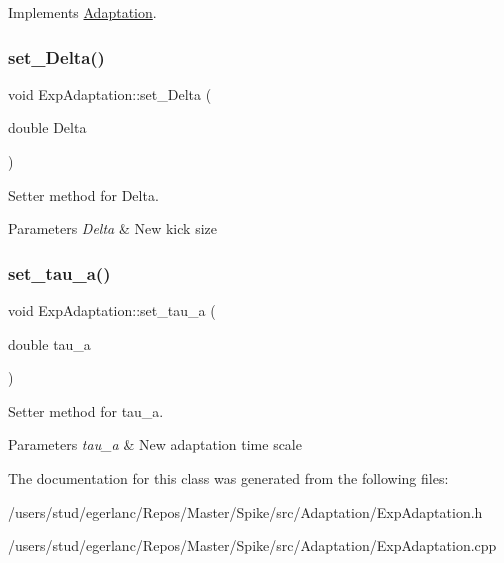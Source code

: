 Implements \hyperlink{classAdaptation_a146da63f54c22a3c08c2c5ce26f11f66}{Adaptation}.

\mbox{\label{classExpAdaptation_aec93194aa8a695cbb26c47c40469a153}} 
\subsubsection{\texorpdfstring{set\+\_\+\+Delta()}{set\_Delta()}}
{\footnotesize\ttfamily void Exp\+Adaptation\+::set\+\_\+\+Delta (\begin{DoxyParamCaption}\item[{double}]{Delta }\end{DoxyParamCaption})\hspace{0.3cm}{\ttfamily [inline]}}



Setter method for Delta. 


\begin{DoxyParams}{Parameters}
{\em Delta} & New kick size \\
\hline
\end{DoxyParams}
\mbox{\label{classExpAdaptation_a9093324d5aff70f75b82f302f698d468}} 
\subsubsection{\texorpdfstring{set\+\_\+tau\+\_\+a()}{set\_tau\_a()}}
{\footnotesize\ttfamily void Exp\+Adaptation\+::set\+\_\+tau\+\_\+a (\begin{DoxyParamCaption}\item[{double}]{tau\+\_\+a }\end{DoxyParamCaption})\hspace{0.3cm}{\ttfamily [inline]}}



Setter method for tau\+\_\+a. 


\begin{DoxyParams}{Parameters}
{\em tau\+\_\+a} & New adaptation time scale \\
\hline
\end{DoxyParams}


The documentation for this class was generated from the following files\+:\begin{DoxyCompactItemize}
\item 
/users/stud/egerlanc/\+Repos/\+Master/\+Spike/src/\+Adaptation/Exp\+Adaptation.\+h\item 
/users/stud/egerlanc/\+Repos/\+Master/\+Spike/src/\+Adaptation/Exp\+Adaptation.\+cpp\end{DoxyCompactItemize}
